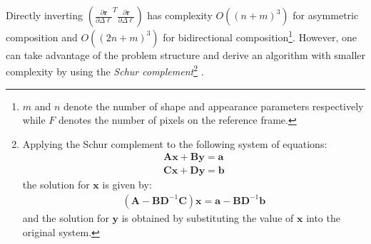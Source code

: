 Directly inverting $\left( \frac{\partial \mathbf{r}}{\partial \Delta \boldsymbol{\ell}}^T \frac{\partial \mathbf{r}}{\partial \Delta \boldsymbol{\ell}} \right)$ has complexity $O((n + m)^3)$ for asymmetric composition and $O((2n + m)^3)$ for bidirectional composition\footnote{\label{foot:complexity}$m$ and $n$ denote the number of shape and appearance parameters respectively while $F$ denotes the number of pixels on the reference frame.}. However, one can take advantage of the problem structure and derive an algorithm with smaller complexity by using the \emph{Schur complement}\footnote{
Applying the Schur complement to the following system of equations:
\begin{equation*}
    \begin{aligned}
        \mathbf{A} \mathbf{x} + \mathbf{B} \mathbf{y} = \mathbf{a}
        \\
        \mathbf{C} \mathbf{x} + \mathbf{D} \mathbf{y} = \mathbf{b}
    \label{eq:schur_system}
    \end{aligned}
\end{equation*}
the solution for $\mathbf{x}$ is given by:
\begin{equation*}
    \begin{aligned}
        (\mathbf{A} - \mathbf{B}\mathbf{D}^{-1}\mathbf{C}) \mathbf{x} = \mathbf{a} - \mathbf{B}\mathbf{D}^{-1}\mathbf{b}
    \label{eq:schur_system}
    \end{aligned}
\end{equation*}
and the solution for $\mathbf{y}$ is obtained by substituting the value of $\mathbf{x}$ into the original system.}
\cite{Boyd2004}.

